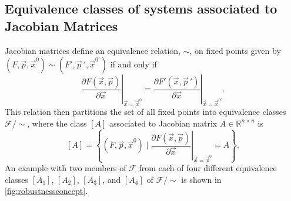 \subsection{Equivalence classes of systems associated to Jacobian Matrices}
Jacobian matrices define an equivalence relation, $\sim$, on fixed points given by $(F,\vec{p},\vec{x}^0) \sim (F',\vec{p}\,',\vec{x}^{0'}) $ if and only if
\begin{equation}\label{eq:jaceqrel}
\left. \frac{\partial F(\vec{x},\vec{p})}{\partial \vec{x}} \right|_{\vec{x} = \vec{x}^0} =
\left. \frac{\partial F'(\vec{x},\vec{p}\,')}{\partial \vec{x}} \right|_{\vec{x} = \vec{x}^{0'}}.
\end{equation}
This relation then partitions the set of all fixed points into equivalence classes $\mathcal{F}/{\sim}$, where the class $[A]$ associated to Jacobian matrix $A \in \mathbb{R}^{n \times n}$ is
\begin{equation}\label{eq:jaceqs}
[A] = \left\{ (F,\vec{p},\vec{x}^0) \; | \; \left. \frac{\partial F(\vec{x},\vec{p})}{\partial \vec{x}} \right|_{\vec{x} = \vec{x}^0} = A \right\}.
\end{equation}
An example with two members of $\mathcal{F}$ from each of four different equivalence classes $[A_1]$, $[A_2]$, $[A_3]$, and $[A_4]$ of $\mathcal{F}/{\sim}$ is shown in \ref{fig:robustnessconcept}.

